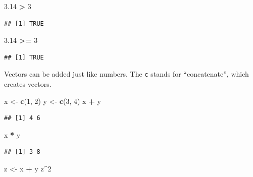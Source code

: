 \documentclass[
  openany]{book}
\newenvironment{Shaded}{\begin{snugshade}}{\end{snugshade}}
\newcommand{\DecValTok}[1]{\textcolor[rgb]{0.00,0.00,0.81}{#1}}
\newcommand{\FloatTok}[1]{\textcolor[rgb]{0.00,0.00,0.81}{#1}}
\newcommand{\KeywordTok}[1]{\textcolor[rgb]{0.13,0.29,0.53}{\textbf{#1}}}
\newcommand{\NormalTok}[1]{#1}
\newcommand{\OperatorTok}[1]{\textcolor[rgb]{0.81,0.36,0.00}{\textbf{#1}}}
\newcommand{\StringTok}[1]{\textcolor[rgb]{0.31,0.60,0.02}{#1}}
\begin{document}
\begin{Shaded}
\begin{Highlighting}[]
\FloatTok{3.14} \OperatorTok{>}\StringTok{ }\DecValTok{3}
\end{Highlighting}
\end{Shaded}

\begin{verbatim}
## [1] TRUE
\end{verbatim}

\begin{Shaded}
\begin{Highlighting}[]
\FloatTok{3.14} \OperatorTok{>=}\StringTok{ }\DecValTok{3}
\end{Highlighting}
\end{Shaded}

\begin{verbatim}
## [1] TRUE
\end{verbatim}

Vectors can be added just like numbers. The \texttt{c} stands for ``concatenate'', which
creates vectors.

\begin{Shaded}
\begin{Highlighting}[]
\NormalTok{x <-}\StringTok{ }\KeywordTok{c}\NormalTok{(}\DecValTok{1}\NormalTok{, }\DecValTok{2}\NormalTok{)}
\NormalTok{y <-}\StringTok{ }\KeywordTok{c}\NormalTok{(}\DecValTok{3}\NormalTok{, }\DecValTok{4}\NormalTok{)}
\NormalTok{x }\OperatorTok{+}\StringTok{ }\NormalTok{y}
\end{Highlighting}
\end{Shaded}

\begin{verbatim}
## [1] 4 6
\end{verbatim}

\begin{Shaded}
\begin{Highlighting}[]
\NormalTok{x }\OperatorTok{*}\StringTok{ }\NormalTok{y}
\end{Highlighting}
\end{Shaded}

\begin{verbatim}
## [1] 3 8
\end{verbatim}

\begin{Shaded}
\begin{Highlighting}[]
\NormalTok{z <-}\StringTok{ }\NormalTok{x }\OperatorTok{+}\StringTok{ }\NormalTok{y}
\NormalTok{z}\OperatorTok{^}\DecValTok{2}
\end{Highlighting}
\end{Shaded}
\end{document}
